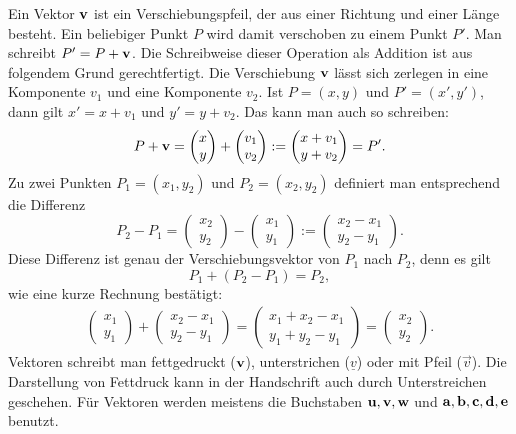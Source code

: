 Ein Vektor $\mathbf{v}$ ist ein Verschiebungspfeil, der aus einer
Richtung und einer Länge besteht. Ein beliebiger Punkt $P$ wird damit
verschoben zu einem Punkt $P'$. Man schreibt $P' = P+\mathbf{v}$. Die
Schreibweise dieser Operation als Addition ist aus folgendem Grund
gerechtfertigt. Die Verschiebung $\mathbf{v}$ lässt sich zerlegen in
eine Komponente $v_1$ und eine Komponente $v_2$. Ist
$P=(x,y)$ und $P'=(x',y')$, dann gilt $x'=x+v_1$ und $y'=y+v_2$.
Das kann man auch so schreiben:%
\begin{equation}
P+\mathbf{v} = \begin{pmatrix}x\\ y\end{pmatrix}
+\begin{pmatrix}v_1\\ v_2\end{pmatrix}
:= \begin{pmatrix}x+v_1\\ y+v_2\end{pmatrix} = P'.
\end{equation}
Zu zwei Punkten $P_1=(x_1,y_2)$ und $P_2=(x_2,y_2)$ definiert man
entsprechend die Differenz
\begin{equation}
P_2-P_1 = \begin{pmatrix}x_2\\ y_2\end{pmatrix}
-\begin{pmatrix}x_1\\ y_1\end{pmatrix}
:= \begin{pmatrix}x_2-x_1\\ y_2-y_1\end{pmatrix}.
\end{equation}
Diese Differenz ist genau der Verschiebungsvektor von $P_1$ nach
$P_2$, denn es gilt
\begin{equation}
P_1+(P_2-P_1) = P_2,
\end{equation}
wie eine kurze Rechnung bestätigt:
\begin{gather*}
\begin{pmatrix}
x_1\\ y_1
\end{pmatrix}
+ \begin{pmatrix}
x_2-x_1\\
y_2-y_1
\end{pmatrix}
= \begin{pmatrix}
x_1+x_2-x_1\\
y_1+y_2-y_1
\end{pmatrix}
= \begin{pmatrix}
x_2\\
y_2
\end{pmatrix}.
\end{gather*}
Vektoren schreibt man fettgedruckt ($\mathbf{v}$), unterstrichen
($\underline v$) oder mit Pfeil ($\vec v$). Die Darstellung von
Fettdruck kann in der Handschrift auch durch Unterstreichen geschehen.
Für Vektoren werden meistens die Buchstaben $\mathbf{u},\mathbf{v},\mathbf{w}$
und $\mathbf{a},\mathbf{b},\mathbf{c},\mathbf{d},\mathbf{e}$ benutzt.

